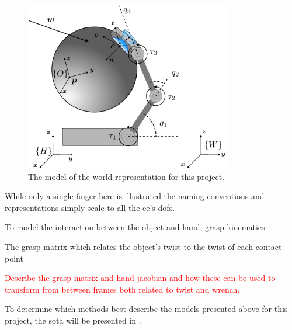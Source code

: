 \begin{figure}[h]
	\begin{small}
		\begin{center}
			\includegraphics[width=0.8\textwidth]{chapters/modeling/fig/test-hand-kinematics-crop.pdf}
		\end{center}
		\caption{The model of the world representation for this project.}
		\label{fig:full-system-model}
	\end{small}
\end{figure}


While only a single finger here is illustrated the naming conventions and representations simply scale to all the \gls{ee}'s \gls{dof}s.\medskip

To model the interaction between the object and hand, grasp kinematics 

The grasp matrix which relates the object's twist \vec{\nu} to the twist of each contact point


\textcolor{red}{Describe the grasp matrix and hand jacobian and how these can be used to transform from between frames both related to twist and wrench.}

To determine which methods best describe the models presented above for this project, the \gls{sota} will be presented in .


